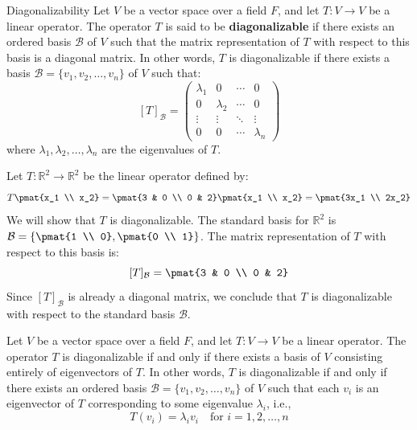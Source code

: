 \documentclass[openany]{book}
\begin{document}
\begin{mydefinition}{Diagonalizability}
    Let $V$ be a vector space over a field $F$, and let $T: V \to V$ be a linear operator. The operator $T$ is said to be \textbf{diagonalizable} if there exists an ordered basis $\mathcal{B}$ of $V$ such that the matrix representation of $T$ with respect to this basis is a diagonal matrix. In other words, $T$ is diagonalizable if there exists a basis $\mathcal{B} = \{v_1, v_2, \ldots, v_n\}$ of $V$ such that:
    $$[T]_{\mathcal{B}} = \begin{pmatrix}
    \lambda_1 & 0 & \cdots & 0 \\
    0 & \lambda_2 & \cdots & 0 \\
    \vdots & \vdots & \ddots & \vdots \\
    0 & 0 & \cdots & \lambda_n
    \end{pmatrix}$$
    where $\lambda_1, \lambda_2, \ldots, \lambda_n$ are the eigenvalues of $T$. 
\end{mydefinition}
\begin{example}
    Let $T: \mathbb{R}^2 \to \mathbb{R}^2$ be the linear operator defined by:
    $$T\pmat{x_1 \\ x_2} = \pmat{3 & 0 \\ 0 & 2}\pmat{x_1 \\ x_2} = \pmat{3x_1 \\ 2x_2}$$
    We will show that $T$ is diagonalizable. The standard basis for $\mathbb{R}^2$ is $\mathcal{B} = \left\{\pmat{1 \\ 0}, \pmat{0 \\ 1}\right\}$. The matrix representation of $T$ with respect to this basis is:
    $$[T]_{\mathcal{B}} = \pmat{3 & 0 \\ 0 & 2}$$
    Since $[T]_{\mathcal{B}}$ is already a diagonal matrix, we conclude that $T$ is diagonalizable with respect to the standard basis $\mathcal{B}$.
\end{example}
\begin{mytheorem}
    Let $V$ be a vector space over a field $F$, and let $T: V \to V$ be a linear operator. The operator $T$ is diagonalizable if and only if there exists a basis of $V$ consisting entirely of eigenvectors of $T$. In other words, $T$ is diagonalizable if and only if there exists an ordered basis $\mathcal{B} = \{v_1, v_2, \ldots, v_n\}$ of $V$ such that each $v_i$ is an eigenvector of $T$ corresponding to some eigenvalue $\lambda_i$, i.e., 
    $$T(v_i) = \lambda_i v_i \quad \text{for } i = 1, 2, \ldots, n$$
\end{mytheorem}
\end{document}
